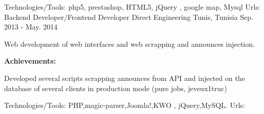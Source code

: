\begin{cventries}
{\begin{cvitems}
      \end{cvitems}
    }
    {\textcolor{awesome}{Technologies/Tools: } {\color{graytext}}  {php5, prestashop, HTML5, jQuery , google map, Mysql}}
     {Urls:} 
    {
    \href{http://www.skopeo.fr/solutions.html }{} \break
    }          
  \techentries
    {Backend Developer/Frontend Developer}
    {Direct Engineering}
    {Tunis, Tunisia}
    {Sep. 2013 - May. 2014}
    {
      \begin{cvitems}
        \item {Web development of web interfaces and web scrapping and announces injection. }
      \end{cvitems}
	\vspace{10pt}\textbf{ Achievements:}
      \begin{cvitems}
	{\vspace{14pt}}
        \item {Developed several scripts scrapping announces from API and injected on the database of several clients in production mode (pure jobs, jeveux1truc) }
      \end{cvitems}
    }
    {\textcolor{awesome}{Technologies/Tools: } {\color{graytext}}  {PHP,magic-parser,Joomla!,KWO , jQuery,MySQL.}}
    {Urls:} 
    {\href{http://www.pure-jobs.com/}{} \break
    }       
\end{cventries}
